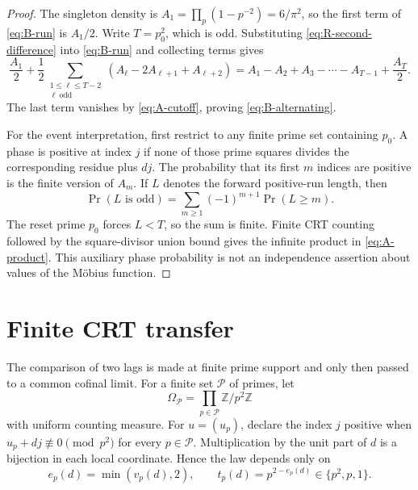 \documentclass[12pt,a4paper]{article}
\theoremstyle{definition}
\newcommand{\Z}{\mathbb Z}
\newcommand{\Pp}{\mathcal P}
\begin{document}
\begin{proof}
The singleton density is
\(A_1=\prod_p(1-p^{-2})=6/\pi^2\), so the first term of
\eqref{eq:B-run} is \(A_1/2\).  Write \(T=p_0^2\), which is odd.  Substituting
\eqref{eq:R-second-difference} into \eqref{eq:B-run} and collecting terms gives
\[
 \frac{A_1}{2}
 +\frac12\sum_{\substack{1\leq\ell\leq T-2\\\ell\ \mathrm{odd}}}
 (A_\ell-2A_{\ell+1}+A_{\ell+2})
 =A_1-A_2+A_3-\cdots-A_{T-1}+\frac{A_T}{2}.
\]
The last term vanishes by \eqref{eq:A-cutoff}, proving
\eqref{eq:B-alternating}.

For the event interpretation, first restrict to any finite prime set
containing \(p_0\).  A phase is positive at index \(j\) if none of those
prime squares divides the corresponding residue plus \(dj\).  The probability
that its first \(m\) indices are positive is the finite version of \(A_m\).
If \(L\) denotes the forward positive-run length, then
\[
 \Pr(L\text{ is odd})
 =\sum_{m\geq1}(-1)^{m+1}\Pr(L\geq m).
\]
The reset prime \(p_0\) forces \(L<T\), so the sum is finite.  Finite CRT
counting followed by the square-divisor union bound gives the infinite product
in \eqref{eq:A-product}.  This auxiliary phase probability is not an
independence assertion about values of the M\"obius function.
\end{proof}

\section{Finite CRT transfer}

The comparison of two lags is made at finite prime support and only then
passed to a common cofinal limit.  For a finite set \(\Pp\) of primes, let
\[
 \Omega_{\Pp}=\prod_{p\in\Pp}\Z/p^2\Z
\]
with uniform counting measure.  For \(u=(u_p)\), declare the index \(j\)
positive when \(u_p+dj\not\equiv0\pmod{p^2}\) for every \(p\in\Pp\).
Multiplication by the unit part of \(d\) is a bijection in each local
coordinate.  Hence the law depends only on
\begin{equation}
 e_p(d)=\min(v_p(d),2),\qquad
 t_p(d)=p^{2-e_p(d)}\in\{p^2,p,1\}.
 \label{eq:local-level}
\end{equation}
\end{document}
